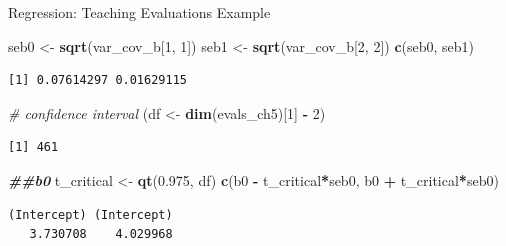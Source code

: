 \documentclass[
  ignorenonframetext,
]{beamer}
\newenvironment{Shaded}{\begin{snugshade}}{\end{snugshade}}
\newcommand{\CommentTok}[1]{\textcolor[rgb]{0.56,0.35,0.01}{\textit{#1}}}
\newcommand{\DecValTok}[1]{\textcolor[rgb]{0.00,0.00,0.81}{#1}}
\newcommand{\DocumentationTok}[1]{\textcolor[rgb]{0.56,0.35,0.01}{\textbf{\textit{#1}}}}
\newcommand{\FloatTok}[1]{\textcolor[rgb]{0.00,0.00,0.81}{#1}}
\newcommand{\FunctionTok}[1]{\textcolor[rgb]{0.13,0.29,0.53}{\textbf{#1}}}
\newcommand{\NormalTok}[1]{#1}
\newcommand{\OtherTok}[1]{\textcolor[rgb]{0.56,0.35,0.01}{#1}}
\newcommand{\SpecialCharTok}[1]{\textcolor[rgb]{0.81,0.36,0.00}{\textbf{#1}}}
\begin{document}
\begin{frame}[fragile]{Regression: Teaching Evaluations Example}
\protect\hypertarget{regression-teaching-evaluations-example-11}{}
\normalsize

\begin{Shaded}
\begin{Highlighting}[]
\NormalTok{seb0 }\OtherTok{\textless{}{-}} \FunctionTok{sqrt}\NormalTok{(var\_cov\_b[}\DecValTok{1}\NormalTok{, }\DecValTok{1}\NormalTok{])}
\NormalTok{seb1 }\OtherTok{\textless{}{-}} \FunctionTok{sqrt}\NormalTok{(var\_cov\_b[}\DecValTok{2}\NormalTok{, }\DecValTok{2}\NormalTok{])}
\FunctionTok{c}\NormalTok{(seb0, seb1)}
\end{Highlighting}
\end{Shaded}

\begin{verbatim}
[1] 0.07614297 0.01629115
\end{verbatim}

\begin{Shaded}
\begin{Highlighting}[]
\CommentTok{\# confidence interval}
\NormalTok{(df }\OtherTok{\textless{}{-}} \FunctionTok{dim}\NormalTok{(evals\_ch5)[}\DecValTok{1}\NormalTok{] }\SpecialCharTok{{-}} \DecValTok{2}\NormalTok{)}
\end{Highlighting}
\end{Shaded}

\begin{verbatim}
[1] 461
\end{verbatim}

\begin{Shaded}
\begin{Highlighting}[]
\DocumentationTok{\#\#b0}
\NormalTok{t\_critical }\OtherTok{\textless{}{-}} \FunctionTok{qt}\NormalTok{(}\FloatTok{0.975}\NormalTok{, df)}
\FunctionTok{c}\NormalTok{(b0 }\SpecialCharTok{{-}}\NormalTok{ t\_critical}\SpecialCharTok{*}\NormalTok{seb0, b0 }\SpecialCharTok{+}\NormalTok{ t\_critical}\SpecialCharTok{*}\NormalTok{seb0)}
\end{Highlighting}
\end{Shaded}

\begin{verbatim}
(Intercept) (Intercept) 
   3.730708    4.029968 
\end{verbatim}

\normalsize
\end{frame}
\end{document}
